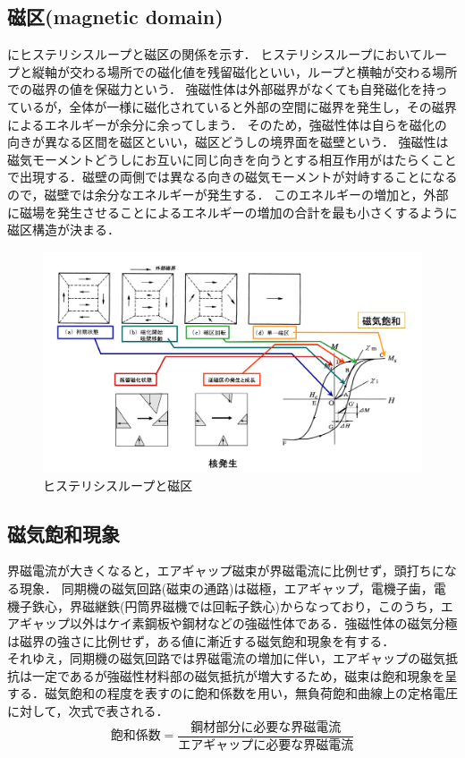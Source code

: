 \subsection{磁区(magnetic domain)\cite{7697152}}
にヒステリシスループと磁区の関係を示す．
ヒステリシスループにおいてループと縦軸が交わる場所での磁化値を残留磁化といい，ループと横軸が交わる場所での磁界の値を保磁力という．
強磁性体は外部磁界がなくても自発磁化を持っているが，全体が一様に磁化されていると外部の空間に磁界を発生し，その磁界によるエネルギーが余分に余ってしまう．
そのため，強磁性体は自らを磁化の向きが異なる区間を磁区といい，磁区どうしの境界面を磁壁という．
強磁性は磁気モーメントどうしにお互いに同じ向きを向うとする相互作用がはたらくことで出現する．磁壁の両側では異なる向きの磁気モーメントが対峙することになるので，磁壁では余分なエネルギーが発生する．
このエネルギーの増加と，外部に磁場を発生させることによるエネルギーの増加の合計を最も小さくするように磁区構造が決まる．
\begin{figure}[h]
	\centering
	\includegraphics[scale=0.35]{fig/domain.png}
	\caption{ヒステリシスループと磁区\cite{cite-keygsdfz}}
	\label{fig:domain}
\end{figure}

\subsection{磁気飽和現象\cite{xdrcfhgvjb}}\label{hohwa}
界磁電流が大きくなると，エアギャップ磁束が界磁電流に比例せず，頭打ちになる現象．
同期機の磁気回路(磁束の通路)は磁極，エアギャップ，電機子歯，電機子鉄心，界磁継鉄(円筒界磁機では回転子鉄心)からなっており，このうち，エアギャップ以外はケイ素鋼板や鋼材などの強磁性体である．強磁性体の磁気分極は磁界の強さに比例せず，ある値に漸近する磁気飽和現象を有する．\\
それゆえ，同期機の磁気回路では界磁電流の増加に伴い，エアギャップの磁気抵抗は一定であるが強磁性材料部の磁気抵抗が増大するため，磁束は飽和現象を呈する．磁気飽和の程度を表すのに飽和係数を用い，無負荷飽和曲線上の定格電圧に対して，次式で表される．
\begin{equation}	
	飽和係数=\frac{鋼材部分に必要な界磁電流}{エアギャップに必要な界磁電流}
\end{equation}

